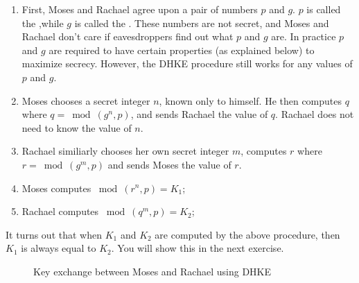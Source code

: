  \begin{enumerate}[Step 1.]
 \item First, Moses and Rachael agree upon a pair of numbers $p$ and $g$. $p$ is called the ,while $g$ is called the . These numbers are not secret, and Moses and Rachael don't care if eavesdroppers find out what $p$ and $g$ are. In practice $p$ and $g$ are required to have certain properties (as explained below) to maximize secrecy.  However, the DHKE procedure still works for any values of $p$ and $g$.
\item Moses chooses a secret integer $n$, known only to himself.  He then computes $q$ where $q =\bmod(g^n,p)$, and sends Rachael the value of $q$. Rachael does not need to know the value of $n$.
\item Rachael similiarly chooses her own secret integer $m$, computes $r$ where $r =\bmod(g^m,p)$ and sends Moses the value of $r$.
\item Moses computes $ \bmod (r^n , p ) = K_1$;
\item Rachael computes $ \bmod (q^m , p ) = K_2$;
\end{enumerate} 
It turns out that when $K_1$ and $K_2$ are computed by the above procedure, then $K_1$ is always equal to $K_2$.  You will show this in the next exercise.  
\begin{figure}[htb]
	  \caption{\label{fig:DH:DHKE_1} Key exchange between Moses and Rachael using DHKE}
\end{figure}

